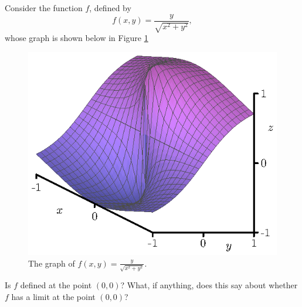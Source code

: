 \begin{activity} \label{A:10.1.1} Consider the function $f$, defined by
  $$
  f(x,y) = \frac{y}{\sqrt{x^2+y^2}},
  $$ 
  whose graph is shown below in
  Figure \ref{F:10.1.disc.2}

  \begin{figure}[ht]
    \begin{center}
      \includegraphics{figures/fig_10_1_disc_2.eps}
      \caption{The graph of $f(x,y) = \frac{y}{\sqrt{x^2+y^2}}$.}
      \label{F:10.1.disc.2}
    \end{center}
  \end{figure}

      
  \ba
\item Is $f$ defined at the point $(0,0)$?  What, if anything, does
  this say about whether $f$ has a limit at the point $(0,0)$? 


\end{activity}
